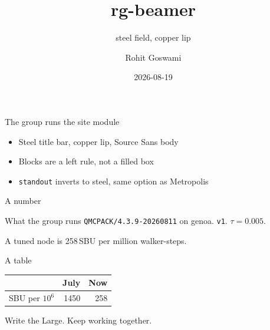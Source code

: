 \documentclass[aspectratio=169,11pt]{beamer}
\title{rg-beamer}
\subtitle{steel field, copper lip}
\author{Rohit Goswami}
\institute{EINF-13109}
\date{2026-08-19}
\begin{document}
\begin{frame}[plain]
  \titlepage
\end{frame}

\begin{frame}{The group runs the site module}
  \begin{itemize}
    \item Steel title bar, copper lip, Source Sans body
    \item Blocks are a left rule, not a filled box
    \item \texttt{standout} inverts to steel, same option as Metropolis
  \end{itemize}
\end{frame}

\begin{frame}{A number}
  \begin{block}{What the group runs}
    \texttt{QMCPACK/4.3.9-20260811} on genoa. \texttt{v1}. $\tau = 0.005$.
  \end{block}
  A tuned node is 258\,SBU per million walker-steps.
\end{frame}

\begin{frame}{A table}
  \begin{center}
  \begin{tabular}{lrr}
    \toprule
     & July & Now \\
    \midrule
    SBU per $10^6$ & 1450 & 258 \\
    \bottomrule
  \end{tabular}
  \end{center}
\end{frame}

\begin{frame}[standout]
  Write the Large. Keep working together.
\end{frame}
\end{document}
